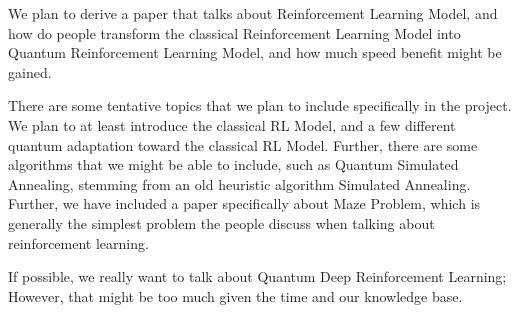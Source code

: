 \documentclass{article}%
\begin{document}
We plan to derive a paper that talks about Reinforcement Learning Model,
and how do people transform the classical Reinforcement Learning Model into
Quantum Reinforcement Learning Model, and how much speed benefit might be gained.

There are some tentative topics that we plan to include specifically in the project.
We plan to at least introduce the classical RL Model, and a few different quantum
adaptation toward the classical RL Model. Further, there are some algorithms
that we might be able to include, such as Quantum Simulated Annealing,
stemming from an old heuristic algorithm Simulated Annealing.
Further, we have included a paper specifically about Maze Problem,
which is generally the simplest problem the people discuss when 
talking about reinforcement learning.

If possible, we really want to talk about Quantum Deep Reinforcement Learning;
However, that might be too much given the time and our knowledge base.




\end{document}
